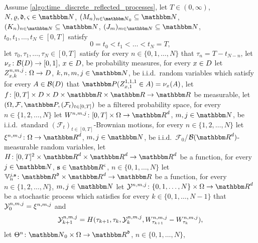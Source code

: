 \begin{algo}
	\label{def:general_algorithm}
	Assume 
		\cref{algo:time_discrete_reflected_processes},
	let
		$T \in (0,\infty)$,
		$N, \varrho, \mathfrak{d}, \varsigma \in \N$,
		$(M_n)_{n\in\N_0}\subseteq\N$,
		$(K_n)_{n\in \N}\subseteq\N$,
		$(J_m)_{m \in \N} \subseteq \N$,
		$t_0,t_1,\ldots,t_N\in [0,T]$ 
	satisfy
	\begin{equation}
		0 = t_0 < t_1 < \ldots < t_N = T
		,
	\end{equation}
	let 
		$\tau_0, \tau_1, \dots,\tau_N \in [0,T]$ 
	satisfy 
		for every 
			$n \in \{0, 1, \dots, N\}$ 
		that 
			$\tau_n= T-t_{N-n}$,
	let
		$\nu_x \colon \mathcal{B}( D )\to [0,1]$,
		$x \in D$,
		be probability measures, 
	for every
		$x \in D$
	let
		$Z^{ n, m,j }_{ x, k } \colon \Omega \to D$,
		$k, n, m, j \in \N$,
		be i.i.d.\ random variables 
		which satisfy 
			for every
				$ A \in \mathcal{B}( D ) $
			that
				$\P( Z_{ x, 1 }^{ 1, 1,1 } \in A ) = \nu_x( A )$,
	let
		$f\colon [0,T] \times \D \times \D \times \R \times \R 
		\to \R$
	be measurable,
	let
		$( \Omega, \F, \P, ( \mathcal{F}_t )_{ t \in [0,T] } )$
		be a filtered probability space,
	for every
		$n \in \{1,2,\ldots,N\}$
	let
		$W^{n,m,j} \colon [0,T] \times \Omega \to \R^d$,
		$m,j \in \N$,
		be i.i.d.\ standard $( \mathcal{F}_t )_{ t \in [0,T] }$-Brownian motions,
	for every
	    $n \in \{1, 2, \ldots,N\}$
	let
		$\xi^{n,m,j}\colon\Omega\to\R^d$,
		$m, j \in \N $,
		be i.i.d.\ $ \mathcal{F}_0$/$\B(\R^d)$-measurable random variables,
	let
		$H\colon [0,T]^2\times\R^d\times\R^d\to\R^d$
		be a function,
	for every
		$j\in\N$,
		$\mathbf{s}\in \R^\varsigma$,
		$n\in\{0, 1, \dots,N\}$
	let
		$ \bV^{j,\mathbf{s}}_n\colon \R^{\mathfrak{d}}\times\R^d\to \R$ be a function,
	for every
		$ n \in \{1,2, \ldots,N\}$,
		$ m,j \in \N $
	let
		$\Y^{n,m,j}\colon \{0,1,\ldots,N\}\times\Omega\to\R^d$
		be a stochastic process which satisfies 
			for every 
				$k\in\{0,1,\ldots,N-1\}$ 
			that 
				${\mathcal{Y}}^{n,m,j}_0 = \xi^{ n, m, j }$ and
			\begin{equation}\label{eq:FormalXapprox}
				{\ensuremath{\mathcal{Y}}}^{n,m,j}_{k+1}
				=
				H(\tau_{k+1},\tau_{k},{\mathcal{Y}}^{n,m,j}_k,W^{n,m,j}_{\tau_{k + 1}} - W^{n,m,j}_{\tau_{k}})
				,
			\end{equation}
	let 
		$\Theta^{n}\colon\N_0\times\Omega\to\R^{\mathfrak{d}}$, $n \in \{0, 1, \dots, N\}$, 

\end{algo}

